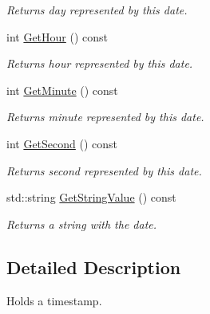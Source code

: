 \begin{DoxyCompactItemize}
\begin{DoxyCompactList}\small\item\em Returns day represented by this date. \end{DoxyCompactList}\item 
\hypertarget{class_common_1_1_date_time_a3b2d1fd6273d9d657ae2d0f8d265c063}{int \hyperlink{class_common_1_1_date_time_a3b2d1fd6273d9d657ae2d0f8d265c063}{Get\-Hour} () const }\label{class_common_1_1_date_time_a3b2d1fd6273d9d657ae2d0f8d265c063}

\begin{DoxyCompactList}\small\item\em Returns hour represented by this date. \end{DoxyCompactList}\item 
\hypertarget{class_common_1_1_date_time_a58a17b09e909d30b271567ba09629143}{int \hyperlink{class_common_1_1_date_time_a58a17b09e909d30b271567ba09629143}{Get\-Minute} () const }\label{class_common_1_1_date_time_a58a17b09e909d30b271567ba09629143}

\begin{DoxyCompactList}\small\item\em Returns minute represented by this date. \end{DoxyCompactList}\item 
\hypertarget{class_common_1_1_date_time_aad38f0369fe0a0c1d4a711ce6dee6af6}{int \hyperlink{class_common_1_1_date_time_aad38f0369fe0a0c1d4a711ce6dee6af6}{Get\-Second} () const }\label{class_common_1_1_date_time_aad38f0369fe0a0c1d4a711ce6dee6af6}

\begin{DoxyCompactList}\small\item\em Returns second represented by this date. \end{DoxyCompactList}\item 
std\-::string \hyperlink{class_common_1_1_date_time_a3b10dedb9400b0c03fec33fdb8ec3c9a}{Get\-String\-Value} () const 
\begin{DoxyCompactList}\small\item\em Returns a string with the date. \end{DoxyCompactList}\end{DoxyCompactItemize}


\subsection{Detailed Description}
Holds a timestamp. 

